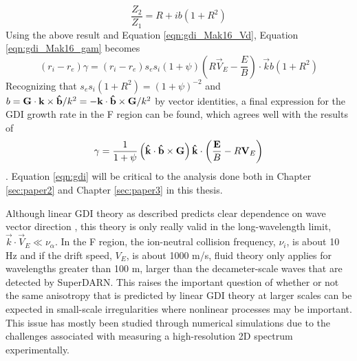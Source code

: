 \begin{equation}
	\frac{Z_2}{Z_1} = R+ib(1+R^2)
\end{equation}
Using the above result and Equation \ref{eqn:gdi_Mak16_Vd}, Equation \ref{eqn:gdi_Mak16_gam} becomes
\begin{equation}
	(r_i-r_e)\gamma = (r_i-r_e)s_es_i\left(1+\psi\right)\left(R\vec{V}_E-\frac{E}{B}\right)\cdot\vec{k}b\left(1+R^2\right)
\end{equation}
Recognizing that \(s_es_i\left(1+R^2\right) = (1+\psi)^{-2}\) and \(b = \mathbf{G}\cdot\mathbf{k}\times\mathbf{\hat{b}}/k^2 = -\mathbf{k}\cdot\mathbf{\hat{b}}\times\mathbf{G}/k^2\) by vector identities, a final expression for the GDI growth rate in the F region can be found, which agrees well with the results of \citet{Makarevich2014c}
\begin{equation}
	\label{eqn:gdi}
	\gamma = \frac{1}{1+\psi}\left(\mathbf{\hat{k}}\cdot\mathbf{\hat{b}}\times\mathbf{G}\right)\mathbf{\hat{k}}\cdot\left(\frac{\mathbf{E}}{B}-R\mathbf{V}_E\right)
\end{equation}.
Equation \ref{eqn:gdi} will be critical to the analysis done both in Chapter \ref{sec:paper2} and Chapter \ref{sec:paper3} in this thesis.


Although linear GDI theory as described predicts clear dependence on wave vector direction \citep{Makarevich2014c}, this theory is only really valid in the long-wavelength limit, \(\vec{k}\cdot\vec{V}_E \ll \nu_\alpha\).  In the F region, the ion-neutral collision frequency, \(\nu_i\), is about 10 Hz and if the drift speed, \(V_E\), is about 1000 m/s, fluid theory only applies for wavelengths greater than 100 m, larger than the decameter-scale waves that are detected by SuperDARN.  This raises the important question of whether or not the same anisotropy that is predicted by linear GDI theory at larger scales can be expected in small-scale irregularities where nonlinear processes may be important.  This issue has mostly been studied through numerical simulations due to the challenges associated with measuring a high-resolution 2D spectrum experimentally.

